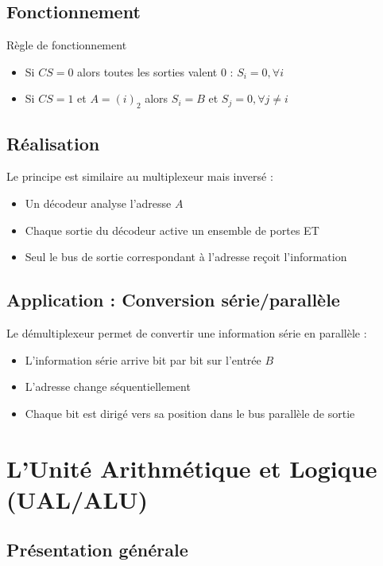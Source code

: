 \documentclass[a4paper,12pt]{article}
\begin{document}
\subsection{Fonctionnement}

\begin{propbox}{Règle de fonctionnement}
\begin{itemize}
    \item Si $CS = 0$ alors toutes les sorties valent 0 : $S_i = 0, \forall i$
    \item Si $CS = 1$ et $A = (i)_2$ alors $S_i = B$ et $S_j = 0, \forall j \neq i$
\end{itemize}
\end{propbox}

\subsection{Réalisation}

Le principe est similaire au multiplexeur mais inversé :
\begin{itemize}
    \item Un décodeur analyse l'adresse $A$
    \item Chaque sortie du décodeur active un ensemble de portes ET
    \item Seul le bus de sortie correspondant à l'adresse reçoit l'information
\end{itemize}

\subsection{Application : Conversion série/parallèle}

Le démultiplexeur permet de convertir une information série en parallèle :
\begin{itemize}
    \item L'information série arrive bit par bit sur l'entrée $B$
    \item L'adresse change séquentiellement
    \item Chaque bit est dirigé vers sa position dans le bus parallèle de sortie
\end{itemize}

\newpage
\section{L'Unité Arithmétique et Logique (UAL/ALU)}

\subsection{Présentation générale}
\end{document}
